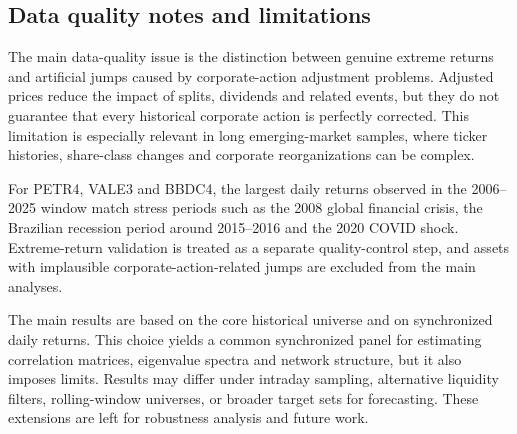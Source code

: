 \subsection{Data quality notes and limitations}

The main data-quality issue is the distinction between genuine extreme returns and artificial jumps caused by corporate-action adjustment problems. Adjusted prices reduce the impact of splits, dividends and related events, but they do not guarantee that every historical corporate action is perfectly corrected. This limitation is especially relevant in long emerging-market samples, where ticker histories, share-class changes and corporate reorganizations can be complex.

For PETR4, VALE3 and BBDC4, the largest daily returns observed in the 2006--2025 window match stress periods such as the 2008 global financial crisis, the Brazilian recession period around 2015--2016 and the 2020 COVID shock. Extreme-return validation is treated as a separate quality-control step, and assets with implausible corporate-action-related jumps are excluded from the main analyses.

The main results are based on the core historical universe and on synchronized daily returns. This choice yields a common synchronized panel for estimating correlation matrices, eigenvalue spectra and network structure, but it also imposes limits. Results may differ under intraday sampling, alternative liquidity filters, rolling-window universes, or broader target sets for forecasting. These extensions are left for robustness analysis and future work.
